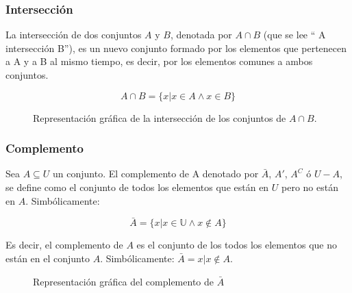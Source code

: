 \subsubsection{Intersección}

La intersección de dos conjuntos $A$ y $B$, denotada por $A \cap B$ (que se lee
“ A intersección B”), es un nuevo conjunto formado por los elementos que
pertenecen a A y a B al mismo tiempo, es decir, por los elementos comunes a
ambos conjuntos.

\begin{equation}
    A \cap B=\{x | x \in A \wedge x \in B\}
\end{equation}

\begin{figure}[h]
    \centering
    \caption{Representación gráfica de la intersección de los conjuntos de $A \cap B$.}
    \label{fig:interseccionConjuntos}
\end{figure}

\subsubsection{Complemento}

Sea $A \subseteq U$ un conjunto. El complemento de A denotado por $\bar{A}$,
$A'$, $A^C$ ó $U-A$, se define como el conjunto de todos los elementos que están
en $U$ pero no están en $A$. Simbólicamente:

\begin{equation}
    \bar{A}= \{x | x \in \mathbb U \wedge x \notin A\}
\end{equation}

Es decir, el complemento de $A$ es el conjunto de los todos los elementos que no
están en el conjunto $A$. Simbólicamente: $ \bar{A}={x | x \notin A}$.

\begin{figure}[h]
    \centering
    \caption{Representación gráfica del complemento de $\bar{A}$}
    \label{fig:unionConjuntos}
\end{figure}

